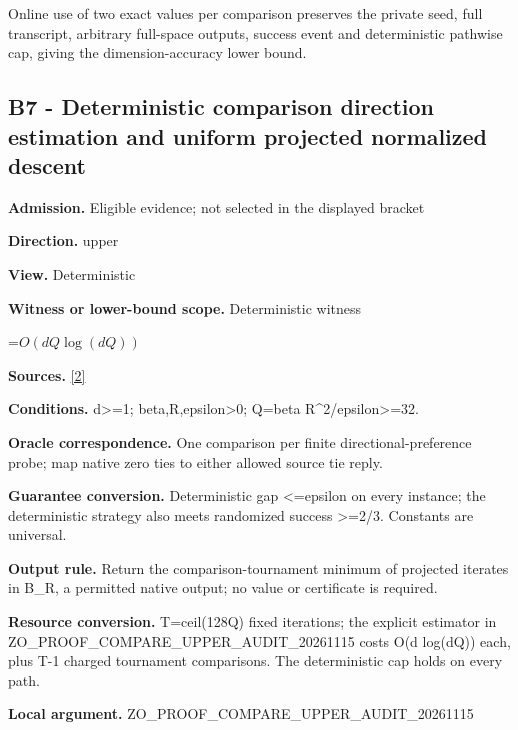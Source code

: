\documentclass[10pt,a4paper]{article}
\newcommand{\AtlasMath}[1]{\par\begingroup\centering\setbox0=\hbox{$\displaystyle #1$}\ifdim\wd0>1.4\linewidth\typeout{ATLAS WIDE FORMULA: \the\wd0}\fi\ifdim\wd0>\linewidth\resizebox{\linewidth}{!}{\box0}\else\box0\fi\par\endgroup}
\begin{document}
Online use of two exact values per comparison preserves the private seed, full transcript, arbitrary full-space outputs, success event and deterministic pathwise cap, giving the dimension-accuracy lower bound.



\subsection{B7 - Deterministic comparison direction estimation and uniform projected normalized descent}


\textbf{Admission.} Eligible evidence; not selected in the displayed bracket



\textbf{Direction.} upper



\textbf{View.} Deterministic



\textbf{Witness or lower-bound scope.} Deterministic witness



\AtlasMath{O(dQ\log(dQ))}


\textbf{Sources.} \href{https://arxiv.org/html/2405.11454v1}{[2]}



\textbf{Conditions.} d>=1; beta,R,epsilon>0; Q=beta R\textasciicircum{}2/epsilon>=32.



\textbf{Oracle correspondence.} One comparison per finite directional-preference probe; map native zero ties to either allowed source tie reply.



\textbf{Guarantee conversion.} Deterministic gap <=epsilon on every instance; the deterministic strategy also meets randomized success >=2/3. Constants are universal.



\textbf{Output rule.} Return the comparison-tournament minimum of projected iterates in B\_R, a permitted native output; no value or certificate is required.



\textbf{Resource conversion.} T=ceil(128Q) fixed iterations; the explicit estimator in ZO\_PROOF\_COMPARE\_UPPER\_AUDIT\_20261115 costs O(d log(dQ)) each, plus T-1 charged tournament comparisons. The deterministic cap holds on every path.



\textbf{Local argument.} ZO\_PROOF\_COMPARE\_UPPER\_AUDIT\_20261115
\end{document}
